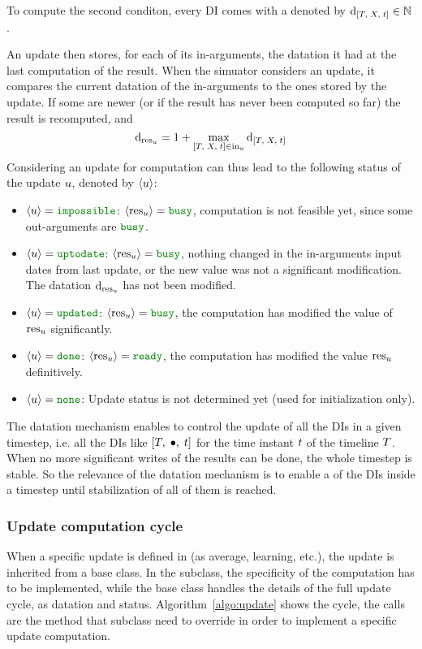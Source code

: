 To compute the second conditon, every DI comes with a  denoted by ${{\mathrm{d}}_{\left[ T,\;X,\;t \right]}} \in {\mathbb{N}}$.

An update then stores, for each of its in-arguments, the datation it had at the last computation of the result. When the simuator considers an update, it compares the current datation of the in-arguments to the ones stored by the update. If some are newer (or if the result has never been computed so far) the result is recomputed, and
\begin{equation}
  {{\mathrm{d}}_{{\mathrm{res}}_{u}}} = {{1} + {\displaystyle\mathop{\mathrm{max}}_{{\left[ T,\;X,\;t \right]} \in {{\mathrm{in}}_{u}}}{{\mathrm{d}}_{\left[ T,\;X,\;t \right]}}}}
\end{equation}
Considering an update for computation can thus lead to the following status of the update $u$, denoted by $\left< u \right>$:
\begin{itemize}
\item $\cxStatusImpossible$: $\cxResBusy$, computation is not feasible yet, since some out-arguments are $\cxBusy$.
\item $\cxStatusUpToDate$:  $\cxResBusy$, nothing changed in the in-arguments input dates from last update, or the new value was not a significant modification. The datation ${\mathrm{d}}_{{\mathrm{res}}_{u}}$ has not been modified.
\item $\cxStatusUpdated$:   $\cxResBusy$, the computation has modified the value of ${\mathrm{res}}_{u}$ significantly.
\item $\cxStatusDone$:      $\cxResReady$, the computation has modified the value ${\mathrm{res}}_{u}$ definitively.
\item $\cxStatusNone$:      Update status is not determined yet (used for initialization only).
\end{itemize}

The datation mechanism enables to control the update of all the DIs in a given timestep, i.e. all the DIs like $\left[ T,\;\bullet,\;t \right]$ for the time instant $t$ of the timeline $T$. When no more significant writes of the results can be done, the whole timestep is stable. So the relevance of the datation mechanism is to enable a  of the DIs inside a timestep until stabilization of all of them is reached.


\subsubsection{Update computation cycle}

When a specific update is defined in \CxSOM (as average, learning, etc.), the update is inherited from a base  class. In the subclass, the specificity of the computation has to be implemented, while the base class handles the details of the full update cycle, as datation and status. Algorithm~\ref{algo:update} shows the cycle, the  calls are the method that subclass need to override in order to implement a specific update computation.

